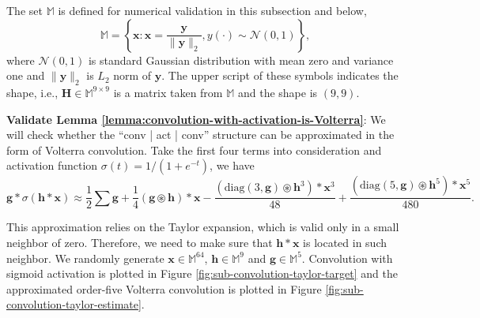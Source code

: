 \documentclass[twoside,11pt]{article}
\def\oconv{\circledast}
\def\diag{\text{diag}}
\def\tvar#1{\mathbf{#1}} %
\begin{document}
The set \(\mathbb{M}\) is defined for numerical validation in this subsection and below,
\begin{equation}
  \mathbb{M} = \left\{
  \tvar{x} : \tvar{x} = \dfrac{\tvar{y}}{\|\tvar{y}\|_{2}}, y(\cdot) \sim \mathcal{N}(0, 1)
  \right\},
  \label{equ:define-the-set-of-gaussian-l2-norm-set-to-1}
\end{equation}
where \(\mathcal{N}(0,1)\) is standard Gaussian distribution with mean zero and variance one and \(\|\tvar{y}\|_{2}\) is \(L_2\) norm of \(\tvar{y}\). The upper script of these symbols indicates the shape, i.e., \(\tvar{H} \in \mathbb{M}^{9 \times 9}\) is a matrix taken from \(\mathbb{M}\) and the shape is \((9, 9)\).

\textbf{Validate Lemma \ref{lemma:convolution-with-activation-is-Volterra}}: We will check whether the ``conv | act | conv'' structure can be approximated in the form of Volterra convolution.
Take the first four terms into consideration and activation function \(\sigma(t) = 1/(1 + e^{-t})\), we have
\begin{equation}
  \label{equ:validate-conv-g-sigoid-conv-h-x}
  \tvar{g} * \sigma(\tvar{h} * \tvar{x})
  \approx \dfrac{1}{2} \sum \tvar{g}
  + \dfrac{1}{4} (\tvar{g} \oconv \tvar{h}) * \tvar{x}
  - \dfrac{(\diag(3, \tvar{g}) \oconv \tvar{h}^3) * \tvar{x}^3}{48}
  + \dfrac{(\diag(5, \tvar{g}) \oconv \tvar{h}^5) * \tvar{x}^5}{480}.
\end{equation}

This approximation relies on the Taylor expansion, which is valid only in a small neighbor of zero. Therefore, we need to make sure that \(\tvar{h} * \tvar{x}\) is located in such neighbor.
We randomly generate \(\tvar{x} \in \mathbb{M}^{64}\), \(\tvar{h} \in \mathbb{M}^{9}\) and \(\tvar{g} \in \mathbb{M}^{5}\). Convolution with sigmoid activation is plotted in Figure \ref{fig:sub-convolution-taylor-target} and the approximated order-five Volterra convolution is plotted in Figure \ref{fig:sub-convolution-taylor-estimate}. %
\end{document}
